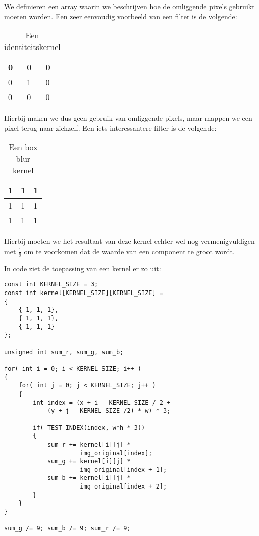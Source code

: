 \documentclass[10pt, twocolumn, a4paper]{article}
\begin{document}
We definieren een array waarin we beschrijven hoe de omliggende pixels gebruikt moeten worden. Een zeer eenvoudig voorbeeld van een filter is de volgende:

\begin{table}[H]
    \centering
    \begin{tabular}{|l|l|l|}
        \hline
        0 & 0 & 0 \\ \hline
        0 & 1 & 0 \\ \hline
        0 & 0 & 0 \\
        \hline
    \end{tabular}
    \caption{Een identiteitskernel}
\end{table}

Hierbij maken we dus geen gebruik van omliggende pixels, maar mappen we een pixel terug naar zichzelf. Een iets interessantere filter is de volgende:

\begin{table}[H]
    \centering
    \begin{tabular}{|l|l|l|}
        \hline
        1 & 1 & 1 \\ \hline
        1 & 1 & 1 \\ \hline
        1 & 1 & 1 \\
        \hline
    \end{tabular}
    \caption{Een box blur kernel}
\end{table}

Hierbij moeten we het resultaat van deze kernel echter wel nog vermenigvuldigen met $\frac{1}{9}$ om te voorkomen dat de waarde van een component te groot wordt.

In code ziet de toepassing van een kernel er zo uit:

\begin{verbatim}
const int KERNEL_SIZE = 3;
const int kernel[KERNEL_SIZE][KERNEL_SIZE] = 
{
    { 1, 1, 1},
    { 1, 1, 1},
    { 1, 1, 1}
};

unsigned int sum_r, sum_g, sum_b;

for( int i = 0; i < KERNEL_SIZE; i++ )
{
    for( int j = 0; j < KERNEL_SIZE; j++ )
    {
        int index = (x + i - KERNEL_SIZE / 2 + 
            (y + j - KERNEL_SIZE /2) * w) * 3;
        
        if( TEST_INDEX(index, w*h * 3))
        {
            sum_r += kernel[i][j] * 
                     img_original[index];
            sum_g += kernel[i][j] *
                     img_original[index + 1];
            sum_b += kernel[i][j] *
                     img_original[index + 2];
        }
    }
}

sum_g /= 9; sum_b /= 9; sum_r /= 9;

\end{verbatim}
\end{document}
